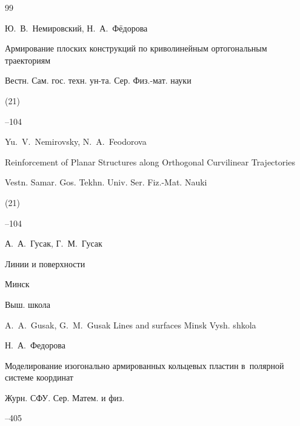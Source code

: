 \begin{thebibliography}{99}






\by Ю.~В.~Немировский, Н.~А.~Фёдорова

\paper Армирование плоских конструкций по криволинейным ортогональным траекториям

\jour Вестн. Сам. гос. техн. ун-та. Сер. Физ.-мат. науки


(21)

--104


\misctransl

\by Yu.~V.~Nemirovsky, N.~A.~Feodorova

\paper Reinforcement of Planar Structures along Orthogonal Curvilinear Trajectories

\jour Vestn. Samar. Gos. Tekhn. Univ. Ser. Fiz.-Mat. Nauki


(21)

--104




\by А.~А.~Гусак, Г.~М.~Гусак

\book Линии и поверхности

\publaddr Минск

\publ Выш. школа



\misctransl

\by A.~A.~Gusak, G.~M.~Gusak \book Lines and surfaces \publaddr Minsk \publ Vysh. shkola  








\by Н.~А.~Федорова

\paper Моделирование изогонально армированных кольцевых пластин в~полярной системе координат

\jour Журн. СФУ. Сер. Матем. и физ.




--405


\end{thebibliography}
